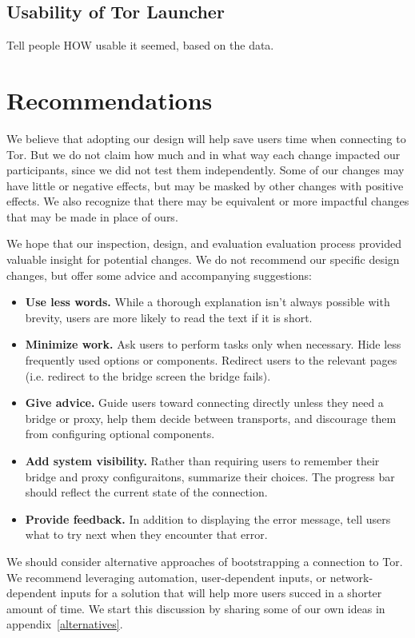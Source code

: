 \documentclass[USenglish,oneside,twocolumn]{article}
\begin{document}
\subsection{Usability of Tor Launcher} 
{\color {blue}
Tell people HOW usable it seemed, based on the data.  
}

\section{Recommendations}
\label{recommendations}
We believe that adopting our design will help save users time when connecting to Tor. But we do not claim how much and in what way each change impacted our participants, since we did not test them independently. Some of our changes may have little or negative effects, but may be masked by other changes with positive effects. We also recognize that there may be equivalent or more impactful changes that may be made in place of ours. 

We hope that our inspection, design, and evaluation evaluation process provided valuable insight for potential changes. We do not recommend our specific design changes, but offer some advice and accompanying suggestions: \\

\begin{itemize}
\item {\bfseries Use less words.} While a thorough explanation isn't always possible with brevity, users are more likely to read the text if it is short.
\item {\bfseries Minimize work.} Ask users to perform tasks only when necessary. Hide less frequently used options or components. Redirect users to the relevant pages (i.e. redirect to the bridge screen the bridge fails).  
\item {\bfseries Give advice.} Guide users toward connecting directly unless they need a bridge or proxy, help them decide between transports, and discourage them from configuring optional components. 
\item {\bfseries Add system visibility.} Rather than requiring users to remember their bridge and proxy configuraitons, summarize their choices. The progress bar should reflect the current state of the connection.
\item {\bfseries Provide feedback.} In addition to displaying the error message, tell users what to try next when they encounter that error. 
\end{itemize}

We should consider alternative approaches of bootstrapping a connection to Tor. We recommend leveraging automation, user-dependent inputs, or network-dependent inputs for a solution that will help more users succed in a shorter amount of time. We start this discussion by sharing some of our own ideas in appendix~\ref{alternatives}. 
\end{document}
